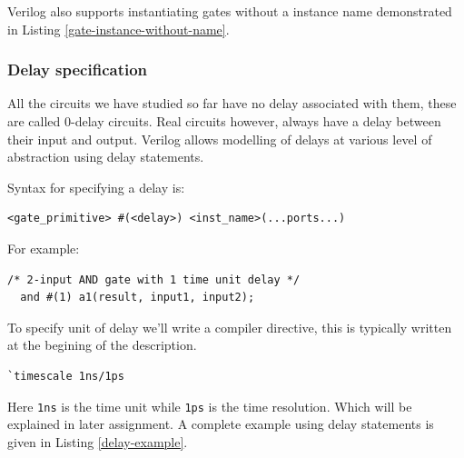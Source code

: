 \documentclass[a4paper,10pt]{article}
\theoremstyle{mytheor}
\newcommand{
  \insertverilog}[3]{
  
}
\begin{document}
\insertverilog{./verilog_files/gateLevelExample.v}{gate-level-impl}{\text{Example module using Gate-level modelling}}

Verilog also supports instantiating gates without a instance name
demonstrated in Listing \ref{gate-instance-without-name}.
\insertverilog{./verilog_files/unnamedGate.v}{gate-instance-without-name}{\text{Instantiating unnamed gates}}

\subsubsection{Delay specification}
All the circuits we have studied so far have no delay associated with
them, these are called 0-delay circuits. Real circuits however, always
have a delay between their input and output. Verilog allows modelling
of delays at various level of abstraction using delay statements.

Syntax for specifying a delay is:
\begin{lstlisting}[style=verilog-inline-style, xleftmargin=0.2\textwidth]
  <gate_primitive> #(<delay>) <inst_name>(...ports...) 
\end{lstlisting}

For example:
\begin{lstlisting}[style=verilog-inline-style, xleftmargin=0.25\textwidth]
  /* 2-input AND gate with 1 time unit delay */
  and #(1) a1(result, input1, input2);
\end{lstlisting}

\vspace{0.1cm}
To specify unit of delay we'll write a compiler
directive, this is typically written at the begining of the
description.

\begin{center}
  \begin{lstlisting}[style=verilog-inline-style,xleftmargin=.35\textwidth]
    `timescale 1ns/1ps
  \end{lstlisting}
\end{center}


Here \lstinline[upquote=true]{1ns} is the time unit while
\lstinline[upquote=true]{1ps} is the time resolution. Which will be
explained in later assignment. A complete example using delay
statements is given in Listing \ref{delay-example}.

\insertverilog{./verilog_files/delayExample.v}{delay-example}{\text{Example usage of delays statement to specify propagation delay of logic gates.}}
\end{document}
